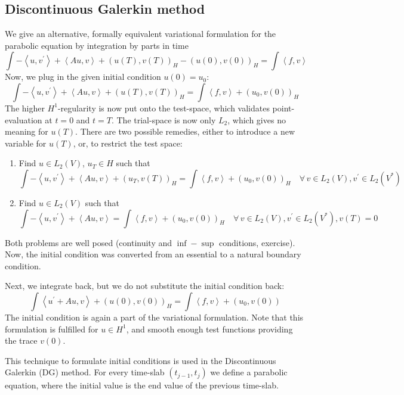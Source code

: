 \subsection{Discontinuous Galerkin method}

We give an alternative, formally equivalent variational formulation for the parabolic equation by integration by parts in time
$$
\int - \left< u, v^\prime \right> + \left< A u, v \right> + (u(T),v(T))_H - (u(0), v(0))_H = \int  \left< f, v \right> 
$$ 
Now, we plug in the given initial condition $u(0) = u_0$:
$$
\int - \left< u, v^\prime \right> + \left< A u, v \right> + (u(T),v(T))_H = \int  \left< f, v \right> + (u_0, v(0))_H
$$
The higher $H^1$-regularity is now put onto the test-space, which validates point-evaluation at $t=0$ and $t=T$. The trial-space is now only $L_2$, which gives no meaning for $u(T)$. There are two possible remedies, either to introduce a new variable for $u(T)$, or, to restrict the test space:
\begin{enumerate}
\item Find $u \in L_2(V)$, $u_T \in H$ such that
\begin{equation}
\int - \left< u, v^\prime\right> + \left< A u, v\right>  + (u_T, v(T))_H = \int \left< f, v \right> + (u_0, v(0))_H \quad \forall \, v \in L_2(V) , v^\prime \in L_2(V^\ast)
\end{equation}
\item Find $u \in L_2(V)$ such that
\begin{equation}
\int - \left< u, v^\prime\right> + \left< A u, v\right>  = \int \left< f, v \right> + (u_0, v(0))_H \quad \forall \, v \in L_2(V) , v^\prime \in L_2(V^\ast), v(T) = 0
\end{equation}
\end{enumerate}
Both problems are well posed (continuity and $\inf-\sup$ conditions, exercise). Now, the initial condition was converted from an essential to a natural boundary condition. 

Next, we integrate back, but we do not substitute the initial condition back:
$$
\int \left< u^\prime + A u, v \right> + (u(0), v(0))_H = \int \left< f, v \right> + (u_0, v(0))
$$
The initial condition is again a part of the variational formulation. Note that this formulation is fulfilled for $u \in H^1$, and smooth enough test functions providing the trace $v(0)$.

This technique to formulate initial conditions is used in the Discontinuous Galerkin (DG) method. For every time-slab $(t_{j-1}, t_j)$ we define a parabolic equation, where the initial value is the end value of the previous time-slab.

